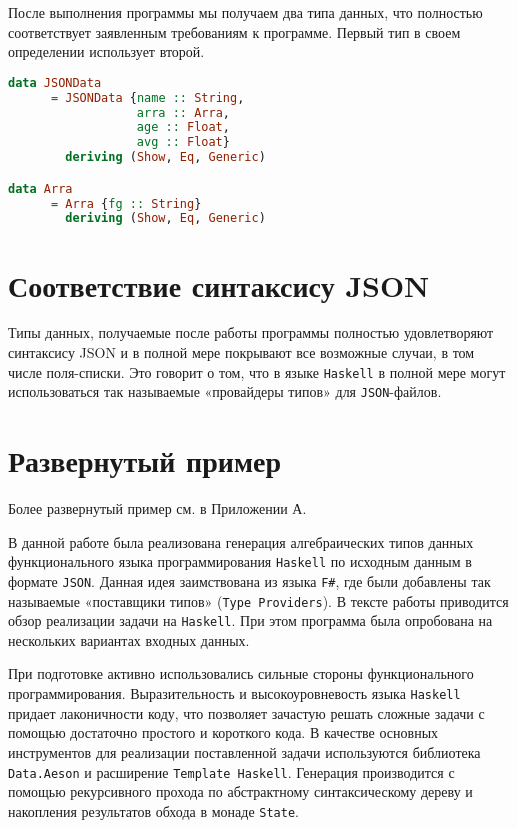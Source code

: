 После выполнения программы мы получаем два типа данных, что полностью соответствует заявленным требованиям к программе. Первый тип в своем определении использует второй. 

\begin{lstlisting}[language=Haskell]
data JSONData
      = JSONData {name :: String,
                  arra :: Arra,
                  age :: Float,
                  avg :: Float}
        deriving (Show, Eq, Generic)

data Arra
      = Arra {fg :: String}
        deriving (Show, Eq, Generic)            
\end{lstlisting}

\section{Соответствие синтаксису JSON}

Типы данных, получаемые после работы программы полностью удовлетворяют синтаксису JSON и в полной мере покрывают все возможные случаи, в том числе поля-списки. Это говорит о том, что в языке \lstinline{Haskell} в полной мере могут использоваться так называемые «провайдеры типов» для \lstinline{JSON}-файлов.

\section{Развернутый пример}

Более развернутый пример см. в Приложении А.

\Conc

В данной работе была реализована генерация алгебраических типов данных функционального языка программирования \lstinline{Haskell} 
по исходным данным в формате \lstinline{JSON}. Данная идея заимствована из языка \lstinline{F#}, где были добавлены так называемые «поставщики типов» (\lstinline{Type Providers}). В тексте работы приводится обзор реализации задачи на \lstinline{Haskell}. При этом программа была опробована на нескольких вариантах входных данных.

При подготовке активно использовались сильные стороны функционального программирования. Выразительность и высокоуровневость языка \lstinline{Haskell} придает лаконичности коду, что позволяет зачастую решать сложные задачи с помощью достаточно простого и короткого кода. В качестве основных инструментов для реализации поставленной задачи используются библиотека \lstinline{Data.Aeson} и расширение \lstinline{Template Haskell}. Генерация производится с помощью рекурсивного прохода по абстрактному синтаксическому дереву и накопления результатов обхода в монаде \lstinline{State}.

